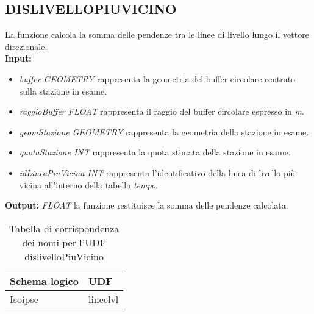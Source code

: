 \subsection{\textbf{DISLIVELLOPIUVICINO}}
La funzione calcola la somma delle pendenze tra le linee di livello lungo il vettore direzionale.\\
\textbf{Input:} 
\begin{itemize}
\item \textit{buffer GEOMETRY} rappresenta la geometria del buffer circolare centrato sulla stazione in esame.
\item \textit{raggioBuffer FLOAT} rappresenta il raggio del buffer circolare espresso in \textit{m}.
\item \textit{geomStazione GEOMETRY} rappresenta la geometria della stazione in esame.
\item \textit{quotaStazione INT} rappresenta la quota stimata della stazione in esame.
\item \textit{idLineaPiuVicina INT} rappresenta l'identificativo della linea di livello più vicina all'interno della tabella \textit{tempo}.
\end{itemize}
\textbf{Output:} \textit{FLOAT} la funzione restituisce la somma delle pendenze calcolata. 

\begin{table}[h]
\centering
\caption{Tabella di corrispondenza dei nomi per l'UDF dislivelloPiuVicino}
\label{mapTb3}
\begin{tabular}{|l|l|}
\hline
Schema logico & UDF      \\ \hline
Isoipse       & lineelvl \\ \hline
\end{tabular}
\end{table} 

